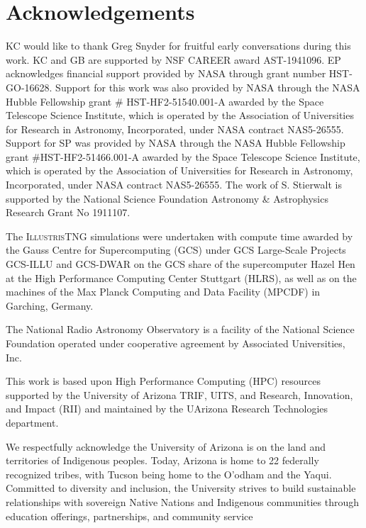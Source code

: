 \documentclass[linenumbers,twocolumn]{aastex631}
\begin{document}
\section*{Acknowledgements}
KC would like to thank Greg Snyder for fruitful early conversations during this work. 
KC and GB are supported by NSF CAREER award AST-1941096. 
EP acknowledges financial support provided by NASA through grant number HST-GO-16628. 
Support for this work was also provided by NASA through the NASA Hubble Fellowship grant \# HST-HF2-51540.001-A awarded by the Space Telescope Science Institute, which is operated by the Association of Universities for Research in Astronomy, Incorporated, under NASA contract NAS5-26555.
Support for SP was provided by NASA through the NASA Hubble Fellowship grant \#HST-HF2-51466.001-A awarded by the Space Telescope Science Institute, which is operated by the Association of Universities for Research in Astronomy, Incorporated, under NASA contract NAS5-26555.
The work of S. Stierwalt is supported by the National Science Foundation Astronomy \& Astrophysics Research Grant No 1911107.

The \textsc{IllustrisTNG} simulations were undertaken with compute time awarded by the Gauss Centre for Supercomputing (GCS) under GCS Large-Scale Projects GCS-ILLU and GCS-DWAR on the GCS share of the supercomputer Hazel Hen at the High Performance Computing Center Stuttgart (HLRS), as well as on the machines of the Max Planck Computing and Data Facility (MPCDF) in Garching, Germany.

The National Radio Astronomy Observatory is a facility of the National Science Foundation operated under cooperative agreement by Associated Universities, Inc.

This work is based upon High Performance Computing (HPC) resources supported by the University of Arizona TRIF, UITS, and Research, Innovation, and Impact (RII) and maintained by the UArizona Research Technologies department.

We respectfully acknowledge the University of Arizona is on the land and territories of Indigenous peoples. Today, Arizona is home to 22 federally recognized tribes, with Tucson being home to the O’odham and the Yaqui. Committed to diversity and inclusion, the University strives to build sustainable relationships with sovereign Native Nations and Indigenous communities through education offerings, partnerships, and community service


{}

\end{document}
